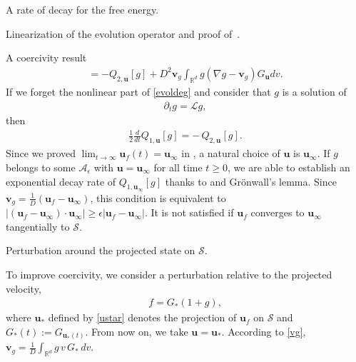 \documentclass[reqno]{amsart} %
\begin{document}
\begin{section}{A rate of decay for the free energy.}
\begin{section}{Linearization of the evolution operator and proof of~\texorpdfstring{}{thm3}.}
\begin{subsection}{A coercivity result}
\begin{align}
    = - Q_{2,\mathbf{u}_{}}[g] + D^2 \mathbf{v}_g  \int_{\mathbb{R}^d}g(\nabla g- \mathbf{v}_g)G_{\mathbf{u}}dv.
\end{align}
If we forget the nonlinear part of \eqref{evoldeg} and consider that $g$ is a solution of 
\begin{align*}
    \partial_tg= \mathcal{L}g,
\end{align*}
then
\begin{align*}
     \frac{1}{2}\frac{d}{dt} Q_{1,\mathbf{u}}[g]=- \,Q_{2,\mathbf{u}_{}}[g].
\end{align*}
Since we proved $\lim_{t\rightarrow \infty}\mathbf{u}_{f}(t)=\mathbf{u}_{\infty}$ in , a natural choice of $\mathbf{u}$ is $\mathbf{u}_{\infty}$.
If $g$ belongs to some $\mathcal{A}_{\epsilon}$ with $\mathbf{u}=\mathbf{u}_{\infty}$ for all time $t\geq 0$, we are able to establish an exponential decay rate of  $Q_{1,\mathbf{u}_\infty}[g]$ thanks to  and Grönwall's lemma. Since $\mathbf{v}_g= \frac{1}{D}(\mathbf{u}_{f}-\mathbf{u}_{\infty})$, this condition is equivalent to ~$|(\mathbf{u}_{f}-\mathbf{u}_{\infty}) \cdot \mathbf{u}_{\infty} | \geq \epsilon  |\mathbf{u}_{f}-\mathbf{u}_{\infty}| $.  It is not satisfied  if $\mathbf{u}_{f}$ converges to $\mathbf{u}_{\infty}$ tangentially to $\mathcal{S}$.

\end{subsection}
\begin{subsection}{Perturbation around the projected state on \texorpdfstring{$\mathcal{S}$}{S}.}

To improve coercivity, we consider a perturbation relative to the projected velocity,
\begin{align}
\label{gstar}
    f=G_{*}(1+g),
\end{align}
 where $\mathbf{u}_*$ defined by \eqref{ustar}
  denotes the projection of $\mathbf{u}_{f}$ on $\mathcal{S}$ and $G_*(t):= G_{\mathbf{u}_*(t)}$. From now on, we take $\mathbf{u}=\mathbf{u}_*$. According to \eqref{vg}, $\mathbf{v}_g= \frac{1}{D}\int_{\mathbb{R}^d}g\,v\,G_*\,dv.$


\end{subsection}
\end{section}
\end{section}
\end{document}
